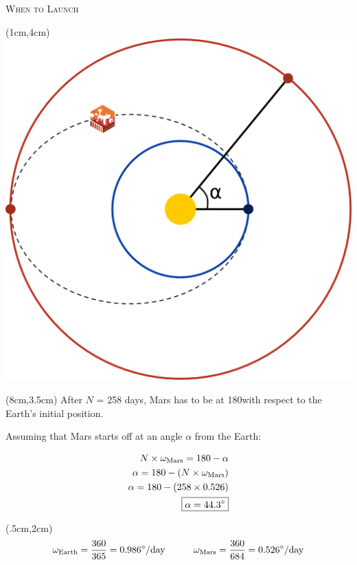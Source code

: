 \documentclass[9pt]{beamer}
\begin{document}
    \begin{frame}{\textsc{When to Launch}}
        \begin{textblock*}{5cm}(1cm,4cm)
            \centering
            \includegraphics[scale=0.35]{assets/alpha.pdf}
        \end{textblock*}
        
        \begin{textblock*}{4cm}(8cm,3.5cm)
            After $N$ = 258 days, Mars has to be at 180\textdegree with respect to the Earth's initial position.

            Assuming that Mars starts off at an angle $\alpha$ from the Earth:

            \centering
            \begin{align*}
                N \times \omega_{\text{Mars}} = 180-\alpha\\
                \alpha = 180 - (N \times \omega_{\text{Mars}})\\
                \alpha = 180 - (258 \times 0.526)\\
                \boxed{\alpha = 44.3\degree}
            \end{align*}

        \end{textblock*}
        
        \begin{textblock*}{12cm}(.5cm,2cm)
        \begin{equation*}
            \omega_{\text{Earth}} = \frac{360}{365} = 0.986\degree/\text{day} \hspace*{3em}  \omega_{\text{Mars}} = \frac{360}{684} = 0.526\degree/\text{day}
        \end{equation*}
        \end{textblock*}
    \end{frame}
\end{document}
